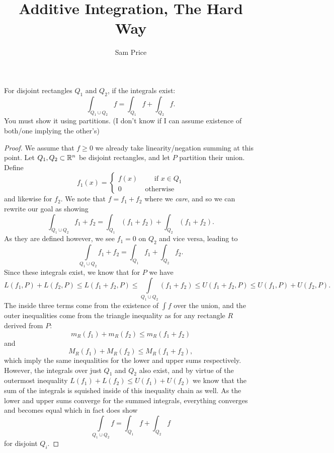 \documentclass{article}
\author{Sam Price}
\title{Additive Integration, The Hard Way}
\begin{document}
\maketitle

\begin{proposition}{}{}
  For disjoint rectangles $Q_{1}$ and $Q_{2}$, if the integrals exist:
  \[ \int_{Q_{1} \cup Q_{2}}f = \int_{Q_{1}}f + \int_{Q_{2}}f. \]
  You must show it using partitions. (I don't know if I can assume existence of both/one implying the other's)
\end{proposition}
\begin{proof}
  We assume that $f \ge 0$ \textendash{} we already take linearity/negation summing at this point.
  Let $Q_{1}, Q_{2} \subset \RR[n]$ be disjoint rectangles, and let $P$ partition their union.
  Define
  \[ f_{1}(x) = \begin{cases}
    f(x) \qquad \text{ if } x \in Q_{1}\\
    0 \quad\qquad \text{ otherwise }
  \end{cases} \]
and likewise for $f_{2}$.
We note that $f = f_{1} + f_{2}$ where we \emph{care}, and so we can rewrite our goal as showing
\[ \int_{Q_{1} \cup Q_{2}} f_{1} + f_{2} = \int_{Q_{1}} (f_{1} + f_{2}) + \int_{Q_{2}} (f_{1} + f_{2}). \]
As they are defined however, we see $f_{1} = 0$ on $Q_{2}$ and vice versa, leading to
\[ \int\limits_{Q_{1} \cup Q_{2}} f_{1} + f_{2} = \int_{Q_{1}} f_{1} + \int_{Q_{2}} f_{2}. \]
Since these integrals exist, we know that for $P$ we have
\[ L(f_{1}, P) + L(f_{2}, P) \le L(f_{1} + f_{2}, P) \le \int\limits_{Q_{1} \cup Q_{2}} (f_{1} + f_{2}) \le U(f_{1} + f_{2}, P) \le U(f_{1}, P) + U(f_{2}, P). \]
The inside three terms come from the existence of $\int f$ over the union, and the outer inequalities come from the triangle inequality as for any rectangle $R$ derived from $P$:
\[ m_{R}(f_{1}) + m_{R}(f_{2}) \le m_{R}(f_{1} + f_{2}) \]
and
\[ M_{R}(f_{1}) + M_{R}(f_{2}) \le M_{R}(f_{1} + f_{2}), \]
which imply the same inequalities for the lower and upper sums respectively.
However, the integrals over just $Q_{1}$ and $Q_{2}$ also exist, and by virtue of the outermost inequality $L(f_{1}) + L(f_{2}) \le U(f_{1}) + U(f_{2})$ we know that
the sum of the integrals is squished inside of this inequality chain as well.
As the lower and upper sums converge for the summed integrals, everything converges and becomes equal which in fact does show
\[ \int\limits_{Q_{1} \cup Q_{2}} f = \int_{Q_{1}} f + \int_{Q_{2}} f \]
for disjoint $Q_{i}$.
\end{proof}
\end{document}
